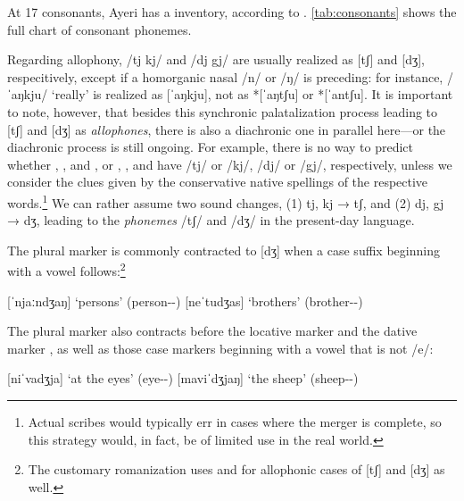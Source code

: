 At 17 consonants, Ayeri has a  inventory, according
to \citet{wals1}. \autoref{tab:consonants} shows the full chart of consonant
phonemes.

Regarding allophony, /tj kj/ and /dj gj/ are usually realized as [tʃ] and [dʒ],
respecitively, except if a homorganic nasal /n/ or /ŋ/ is preceding: for
instance,  /ˈaŋkju/ `really' is realized as [ˈaŋkju], not as
*[ˈaŋtʃu] or *[ˈantʃu]. It is important to note, however, that besides this
synchronic palatalization process leading to [tʃ] and [dʒ] as
\emph{allophones}, there is also a diachronic one in parallel here---or the
diachronic process is still ongoing. For example, there is no way to predict
whether , , and , or ,
, and  have /tj/ or /kj/, /dj/
or /gj/, respectively, unless we consider the clues given by the conservative
native spellings of the respective words.\footnote{Actual scribes would
typically err in cases where the merger is complete, so this strategy would, in
fact, be of limited use in the real world.} We can rather assume two sound
changes, (1) tj, kj → tʃ, and (2) dj, gj → dʒ, leading to the \emph{phonemes}
/tʃ/ and /dʒ/ in the present-day language.

\label{pluralmorph} The plural marker
 is commonly contracted to [dʒ] when a
case suffix beginning with a vowel follows:\footnote{The customary romanization
uses  and  for allophonic cases of [tʃ] and [dʒ] as well.}

\pex
	\a {} 
		[ˈnjaːndʒaŋ] `persons' (person-\Pl{}-\Aarg{})
	\a {} 
		[neˈtudʒas] `brothers' (brother-\Pl{}-\Parg{})
\xe

The plural marker also contracts before
the locative marker  and the dative marker
, as well as those case markers beginning with a vowel that is
not /e/:%

\pex
	\a {} 
		[niˈvadʒja] `at the eyes' (eye-\Pl{}-\Loc{})
	\a {} 
		[maviˈdʒjaŋ] `the sheep' (sheep-\Pl{}-\Aarg{})
\xe

